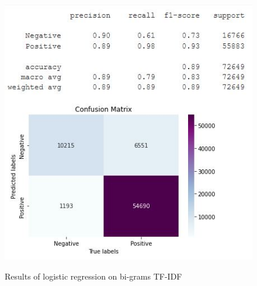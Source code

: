 \documentclass[11pt]{article}
\begin{document}
\hspace{-2cm}
\begin{minipage}[b]{0.48\textwidth}
\centering
\begin{figure}[H]
\begin{center}
  \includegraphics[scale = 0.55]{img/logreg_ngrams.JPG}\\
  \caption{Results of logistic regression on bi-grams TF-IDF}
  \label{ngrams_fig}
\end{center}
\end{figure}
\end{minipage}
\hspace{1cm}
\end{document}
